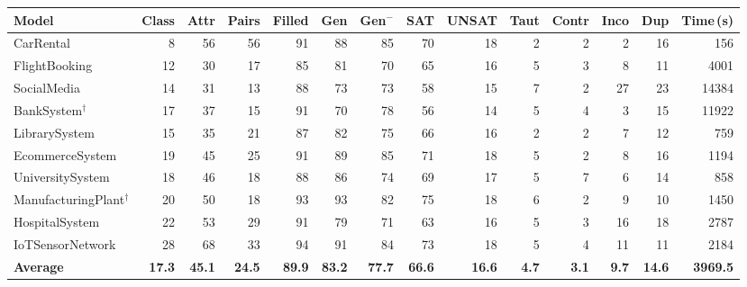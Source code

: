 \begin{table}[t]
\centering
\scriptsize
\setlength{\tabcolsep}{2pt}
\begin{tabular}{l rrr rrr rr rrrr r}
\toprule
\textbf{Model} & \textbf{Class} & \textbf{Attr} & \textbf{Pairs} & \textbf{Filled} & \textbf{Gen} & \textbf{Gen$^{-}$} & \textbf{SAT} & \textbf{UNSAT} & \textbf{Taut} & \textbf{Contr} & \textbf{Inco} & \textbf{Dup} & \textbf{Time\,(s)} \\
\midrule
CarRental                      &     8 &    56 &    56 &    91 &    88 &    85 &    70 &    18 &     2 &     2 &     2 &    16 &   156 \\
FlightBooking                  &    12 &    30 &    17 &    85 &    81 &    70 &    65 &    16 &     5 &     3 &     8 &    11 &  4001 \\
SocialMedia                    &    14 &    31 &    13 &    88 &    73 &    73 &    58 &    15 &     7 &     2 &    27 &    23 & 14384 \\
BankSystem$^{\dagger}$         &    17 &    37 &    15 &    91 &    70 &    78 &    56 &    14 &     5 &     4 &     3 &    15 & 11922 \\
LibrarySystem                  &    15 &    35 &    21 &    87 &    82 &    75 &    66 &    16 &     2 &     2 &     7 &    12 &   759 \\
EcommerceSystem                &    19 &    45 &    25 &    91 &    89 &    85 &    71 &    18 &     5 &     2 &     8 &    16 &  1194 \\
UniversitySystem               &    18 &    46 &    18 &    88 &    86 &    74 &    69 &    17 &     5 &     7 &     6 &    14 &   858 \\
ManufacturingPlant$^{\dagger}$ &    20 &    50 &    18 &    93 &    93 &    82 &    75 &    18 &     6 &     2 &     9 &    10 &  1450 \\
HospitalSystem                 &    22 &    53 &    29 &    91 &    79 &    71 &    63 &    16 &     5 &     3 &    16 &    18 &  2787 \\
IoTSensorNetwork               &    28 &    68 &    33 &    94 &    91 &    84 &    73 &    18 &     5 &     4 &    11 &    11 &  2184 \\
\midrule
\textbf{Average} & \textbf{17.3} & \textbf{45.1} & \textbf{24.5} & \textbf{89.9} & \textbf{83.2} & \textbf{77.7} & \textbf{66.6} & \textbf{16.6} & \textbf{4.7} & \textbf{3.1} & \textbf{9.7} & \textbf{14.6} & \textbf{3969.5} \\
\bottomrule
\end{tabular}

\end{table}
